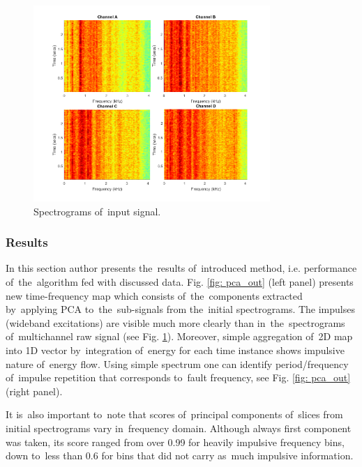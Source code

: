 \begin{figure}[ht!]
\centering
\includegraphics[width = 0.8\textwidth]{wykresy/pca_spec.png}
\caption{Spectrograms of~input signal.}
\label{fig: pca_spec}
\end{figure}

\subsubsection{Results}

In this section author presents the~results of~introduced method, i.e. performance of~the~algorithm fed with discussed data. Fig. \ref{fig: pca_out} (left panel) presents new time-frequency map which consists of~the~components extracted by~applying PCA to~the~sub-signals from the~initial spectrograms. The impulses (wideband excitations) are visible much more clearly than in~the~spectrograms of~multichannel raw signal (see Fig. \ref{fig: pca_spec}). Moreover, simple aggregation of~2D map into 1D vector by~integration of~energy for each time instance shows impulsive nature of~energy flow. Using simple spectrum one can identify period/frequency of~impulse repetition that corresponds to~fault frequency, see Fig. \ref{fig: pca_out} (right panel).

It is~also important to~note that scores of~principal components of~slices from initial spectrograms vary in~frequency domain. Although always first component was taken, its score ranged from over 0.99 for heavily impulsive frequency bins, down to~less than 0.6 for bins that did not carry as~much impulsive information.

